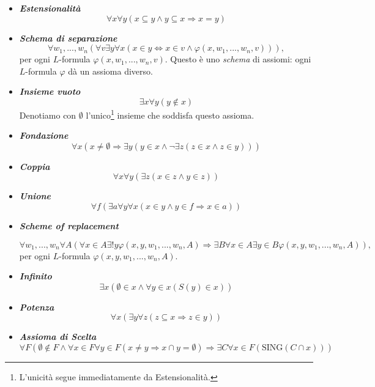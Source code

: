 \documentclass[12pt,a4paper]{report}
\theoremstyle{definition}
\theoremstyle{num.custom-title}
\renewcommand{\phi}{\varphi}
\begin{document}
\begin{itemize}
\item \emph{\textbf{Estensionalità}}
\[
\forall x \forall y (x \subseteq y \land y \subseteq x \Rightarrow x=y)
\]

\item \emph{\textbf{Schema di separazione}}
\[
\forall w_1,...,w_n (\forall v \exists y \forall x (x \in y \Leftrightarrow x \in v \land \phi(x,w_1,...,w_n,v))),
\]
per ogni $L$-formula $\phi(x,w_1,...,w_n,v)$. Questo è uno \emph{schema} di assiomi: ogni $L$-formula $\phi$ dà un assioma diverso.

\item \emph{\textbf{Insieme vuoto}}
\[
\exists x \forall y (y \notin x)
\]
Denotiamo con $\emptyset$ l'unico\footnote{L'unicità segue immediatamente da Estensionalità.} insieme che soddisfa questo assioma.

\item \emph{\textbf{Fondazione}}
\[
\forall x (x \neq \emptyset \Rightarrow \exists y (y \in x \land \neg \exists z (z \in x \land z \in y)  ))
\]

\item \emph{\textbf{Coppia}}
\[
\forall x \forall y ( \exists z (x \in z \land y \in z))
\]

\item \emph{\textbf{Unione}}
\[
\forall f ( \exists a \forall y \forall x (x \in y \land y \in f \Rightarrow x \in a))
\]

\item \emph{\textbf{Scheme of replacement}}

\[
\forall w_1,...,w_n \forall A( \forall x \in A \exists ! y \phi(x,y,w_1,...,w_n,A) \Rightarrow \exists B \forall x \in A \exists y \in B \phi (x,y,w_1,...,w_n,A)),
\]
per ogni $L$-formula $\phi(x,y,w_1,...,w_n,A)$.


\item \emph{\textbf{Infinito}}
\[
\exists x (\emptyset \in x \land \forall y \in x (S(y) \in x) )
\]

\item \emph{\textbf{Potenza}}
\[
\forall x ( \exists y \forall z (z \subseteq x \Rightarrow z \in y ))
\]

\item \emph{\textbf{Assioma di Scelta}}
\[
\forall F ( \emptyset \notin F \land \forall x \in F \forall y \in F (x \neq y  \Rightarrow x \cap y= \emptyset ) \Rightarrow \exists C \forall x \in F (\mathrm{SING}(C \cap x)) )
\]
\end{itemize}
\end{document}
